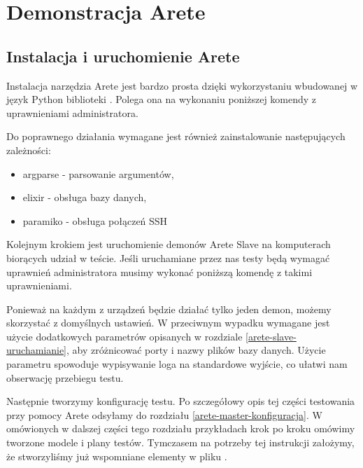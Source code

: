 \documentclass[00-praca-magisterska.tex]{subfiles}
\begin{document}
\chapter{Demonstracja Arete}
\label{demonstracja-arete}

\section{Instalacja i uruchomienie Arete}
\label{instalacja-i-uruchomienie-arete}

Instalacja narzędzia Arete jest bardzo prosta dzięki wykorzystaniu wbudowanej w
język Python biblioteki  \cite{distutils}. Polega ona na
wykonaniu poniższej komendy z uprawnieniami administratora.


Do poprawnego działania wymagane jest również zainstalowanie następujących
zależności:

\begin{itemize}
\item{argparse \cite{argparse} - parsowanie argumentów,}
\item{elixir \cite{elixir} - obsługa bazy danych,}
\item{paramiko \cite{paramiko} - obsługa połączeń SSH}
\end{itemize}

Kolejnym krokiem jest uruchomienie demonów Arete Slave na komputerach biorących
udział w teście. Jeśli uruchamiane przez nas testy będą wymagać uprawnień
administratora musimy wykonać poniższą komendę z takimi uprawnieniami.


Ponieważ na każdym z urządzeń będzie działać tylko jeden demon, możemy
skorzystać z domyślnych ustawień. W przeciwnym wypadku wymagane jest użycie
dodatkowych parametrów opisanych w rozdziale \ref{arete-slave-uruchamianie}, aby
zróżnicować porty i nazwy plików bazy danych. Użycie parametru 
spowoduje wypisywanie loga na standardowe wyjście, co ułatwi nam obserwację
przebiegu testu. 

Następnie tworzymy konfigurację testu. Po szczegółowy opis tej części
testowania przy pomocy Arete odsyłamy do rozdziału \ref{arete-master-konfiguracja}.
W omówionych w dalszej części tego rozdziału przykładach krok po kroku omówimy
tworzone modele i plany testów. Tymczasem na potrzeby tej instrukcji założymy,
że stworzyliśmy już wspomniane elementy w pliku .
\end{document}
